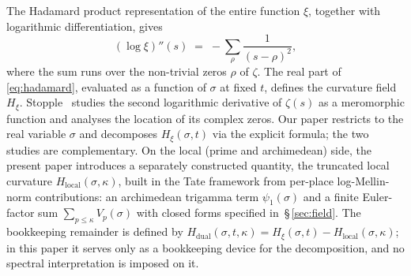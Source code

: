 \documentclass[11pt]{article}
\newcommand{\Hxi}{H_{\xi}}
\newcommand{\Hlocal}{H_{\mathrm{local}}}
\newcommand{\Hdual}{H_{\mathrm{dual}}}
\begin{document}
The Hadamard product representation of the entire function
$\xi$, together with logarithmic differentiation, gives
\begin{equation}\label{eq:hadamard}
(\log\xi)''(s)
\;=\;-\sum_{\rho}\frac{1}{(s-\rho)^{2}},
\end{equation}
where the sum runs over the non-trivial zeros $\rho$ of
$\zeta$.
The real part of \eqref{eq:hadamard}, evaluated as a function
of $\sigma$ at fixed $t$, defines the curvature field $\Hxi$.
Stopple~\cite{Stopple16} studies the second logarithmic
derivative of $\zeta(s)$ as a meromorphic function and
analyses the location of its complex zeros. Our paper
restricts to the real variable $\sigma$ and decomposes
$\Hxi(\sigma,t)$ via the explicit formula; the two
studies are complementary.
On the local (prime and archimedean) side, the present paper
introduces a separately constructed quantity, the truncated
local curvature $\Hlocal(\sigma,\kappa)$, built in the Tate
framework from per-place log-Mellin-norm contributions: an
archimedean trigamma term $\psi_1(\sigma)$ and a finite
Euler-factor sum $\sum_{p\le\kappa}V_p(\sigma)$ with closed
forms specified in~\S\,\ref{sec:field}.
The bookkeeping remainder is defined by
$\Hdual(\sigma,t,\kappa)=\Hxi(\sigma,t)-\Hlocal(\sigma,\kappa)$;
in this paper it serves only as a bookkeeping device for the
decomposition, and no spectral interpretation is imposed on
it.
\end{document}
